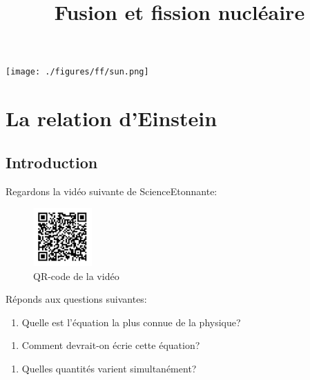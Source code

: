 \documentclass[
  letterpaper,
  DIV=11,
  numbers=noendperiod]{scrartcl}
\title{Fusion et fission nucléaire}
\author{}
\date{}
\providecommand{\tightlist}{%
  \setlength{\itemsep}{0pt}\setlength{\parskip}{0pt}}\usepackage{longtable,booktabs,array}
\begin{document}
\maketitle


\texttt{[image: ./figures/ff/sun.png]}
\newpage

\section{La relation d'Einstein}\label{la-relation-deinstein}

\subsection{Introduction}\label{introduction}

Regardons la vidéo suivante de ScienceEtonnante:

\begin{figure}[H]

{\centering \includegraphics[width=0.2\textwidth,height=\textheight]{figures/ff/video-mc2.pdf}

}

\caption{QR-code de la vidéo}

\end{figure}%

Réponds aux questions suivantes:

\begin{enumerate}
\def\labelenumi{\arabic{enumi}.}
\tightlist
\item
  Quelle est l'équation la plus connue de la physique?
\end{enumerate}

\vspace{1cm}

\begin{enumerate}
\def\labelenumi{\arabic{enumi}.}
\setcounter{enumi}{1}
\tightlist
\item
  Comment devrait-on écrie cette équation?
\end{enumerate}

\vspace{1cm}

\begin{enumerate}
\def\labelenumi{\arabic{enumi}.}
\setcounter{enumi}{2}
\tightlist
\item
  Quelles quantités varient simultanément?
\end{enumerate}
\end{document}
